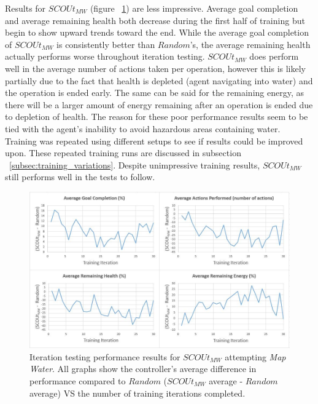 Results for $SCOUt_{MW}$ (figure ~\ref{fig:mapwater_training_results}) are less impressive.
Average goal completion and average remaining health both decrease during the first half of training but begin to show upward trends toward the end.
While the average goal completion of $SCOUt_{MW}$ is consistently better than $Random$'s, the average remaining health actually performs worse throughout iteration testing.
$SCOUt_{MW}$ does perform well in the average number of actions taken per operation, however this is likely partially due to the fact that health is depleted (agent navigating into water) and the operation is ended early.
The same can be said for the remaining energy, as there will be a larger amount of energy remaining after an operation is ended due to depletion of health.
The reason for these poor performance results seem to be tied with the agent's inability to avoid hazardous areas containing water.
Training was repeated using different setups to see if results could be improved upon.
These repeated training runs are discussed in subsection ~\ref{subsec:training_variations}.
Despite unimpressive training results, $SCOUt_{MW}$ still performs well in the tests to follow.

\begin{figure}[H]
  \includegraphics[width=1.0\columnwidth]{Figures/Results/Training/SCOUt-MapWater.JPG}
  \caption{Iteration testing performance results for $SCOUt_{MW}$ attempting \textit{Map Water}. All graphs show the controller's average difference in performance compared to $Random$ ($SCOUt_{MW}$ average - $Random$ average) VS the number of training iterations completed.}
  \label{fig:mapwater_training_results}
\end{figure}

